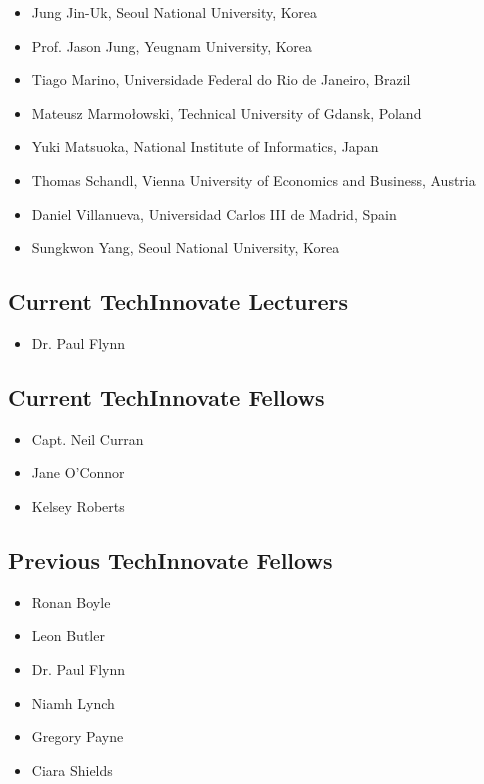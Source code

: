 \documentclass[10pt,a4paper]{res} %
\begin{document}
\begin{resume}
\begin{itemize}
\item Jung Jin-Uk, Seoul National University, Korea
\item Prof. Jason Jung, Yeugnam University, Korea
\item Tiago Marino, Universidade Federal do Rio de Janeiro, Brazil
\item Mateusz Marmo{\l}owski, Technical University of Gdansk, Poland
\item Yuki Matsuoka, National Institute of Informatics, Japan
\item Thomas Schandl, Vienna University of Economics and Business, Austria
\item Daniel Villanueva, Universidad Carlos III de Madrid, Spain
\item Sungkwon Yang, Seoul National University, Korea
\end{itemize}

\subsection*{Current TechInnovate Lecturers}

\begin{itemize} \itemsep -2pt
\item Dr. Paul Flynn
\end{itemize}

\subsection*{Current TechInnovate Fellows}

\begin{itemize} \itemsep -2pt
\item Capt. Neil Curran
\item Jane O'Connor
\item Kelsey Roberts
\end{itemize}

\subsection*{Previous TechInnovate Fellows}

\begin{itemize} \itemsep -2pt
\item Ronan Boyle
\item Leon Butler
\item Dr. Paul Flynn
\item Niamh Lynch
\item Gregory Payne
\item Ciara Shields
\end{itemize}


\end{resume}
\end{document}
